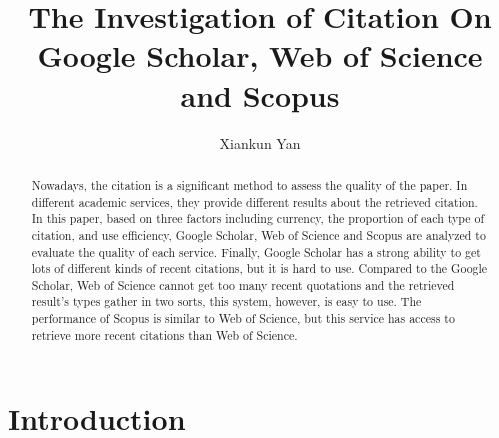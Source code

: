 \documentclass[runningheads]{llncs}
\begin{document}
%

\title{The Investigation of Citation On Google Scholar, Web of Science and Scopus }
%
%
\author{Xiankun Yan}
%
%
\maketitle
%

%
\begin{abstract}
Nowadays, the citation is a significant method to assess the quality of the paper. In different academic services, they provide different results about the retrieved citation. In this paper, based on three factors including currency, the proportion of each type of citation, and use efficiency, Google Scholar, Web of Science and Scopus are analyzed to evaluate the quality of each service. Finally, Google Scholar has a strong ability to get lots of different kinds of recent citations, but it is hard to use. Compared to the Google Scholar, Web of Science cannot get too many recent quotations and the retrieved result's types gather in two sorts,  this system, however, is easy to use. The performance of Scopus is similar to Web of Science, but this service has access to retrieve more recent citations than Web of Science.

\end{abstract}
%
%
%
\section{Introduction}
\end{document}
